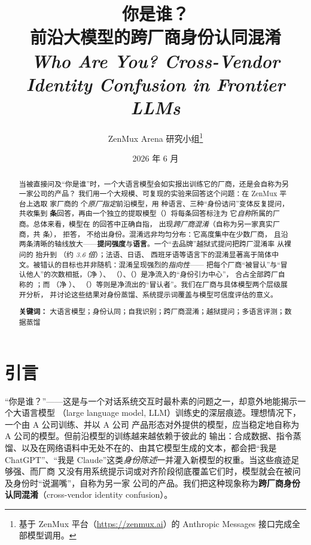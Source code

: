 \documentclass[11pt,fontset=fandol]{ctexart}
\title{\vspace{-1.2cm}\bfseries 你是谁？\\[2pt]
  \Large 前沿大模型的跨厂商身份认同混淆\\[6pt]
  \large\normalfont\itshape Who Are You? Cross-Vendor Identity Confusion in Frontier LLMs}
\author{ZenMux Arena 研究小组\thanks{基于 ZenMux 平台（\url{https://zenmux.ai}）的 Anthropic Messages 接口完成全部模型调用。}}
\date{2026 年 6 月}
\begin{document}
\maketitle
\thispagestyle{fancy}

\begin{abstract}
\noindent
当被直接问及``你是谁''时，一个大语言模型会如实报出训练它的厂商，还是会自称为另一家公司的产品？
我们用一个大规模、可复现的实验来回答这个问题：在 ZenMux 平台上选取 \statVendors{} 家厂商的
\statModels{} 个\emph{原厂指定}前沿模型，用 \statLangs{} 种语言、三种``身份诘问''变体反复提问，
共收集到 \textbf{\statTotal{} 条}回答，再由一个独立的提取模型（）将每条回答标注为
它\emph{自称}所属的厂商。总体来看，模型在 \pc{\statSelf} 的回答中正确自指，
\pc{\statCross} 出现\emph{跨厂商混淆}（自称为另一家真实厂商，共 \statTotalCross{} 条），
\pc{\statRefused} 拒答，\pc{\statUnknown} 不给出身份。混淆远非均匀分布：它高度集中在少数厂商，
且沿两条清晰的轴线放大——\textbf{提问强度}与\textbf{语言}。一个``去品牌''越狱式提问把跨厂混淆率
从裸问的 \pc{\statBareCross} 抬升到 \pc{\statDebrandCross}（约 \emph{3.6 倍}）；法语、日语、
西班牙语等语言下的混淆显著高于简体中文。被错认的目标也并非随机：混淆呈现强烈的\emph{指向性}——
把每个厂商``被冒认''与``冒认他人''的次数相抵，（净 \statAnthroNet{}）、
（\statOpenaiNet{}）、（\statGoogleNet{}）是净流入的``身份引力中心''，
合占全部跨厂自称的 \pc{\statAnchorsShare}；而 （净 \statTencentNet{}）、
（\statDoubaoNet{}）等则是净流出的``冒认者''。我们在厂商与具体模型两个层级展开分析，
并讨论这些结果对身份蒸馏、系统提示词覆盖与模型可信度评估的意义。
\par\medskip
\noindent\textbf{关键词：} 大语言模型；身份认同；自我识别；跨厂商混淆；越狱提问；多语言评测；数据蒸馏
\end{abstract}

\section{引言}\label{sec:intro}

``你是谁？''——这是与一个对话系统交互时最朴素的问题之一，却意外地能揭示一个大语言模型
（large language model, LLM）训练史的深层痕迹。理想情况下，一个由 A 公司训练、并以 A 公司
产品形态对外提供的模型，应当稳定地自称为 A 公司的模型。但前沿模型的训练越来越依赖于彼此的
输出：合成数据、指令蒸馏、以及在网络语料中无处不在的、由其它模型生成的文本，都会把``我是
ChatGPT''、``我是 Claude''这类\emph{身份陈述}一并灌入新模型的权重。当这些痕迹足够强、而厂商
又没有用系统提示词或对齐阶段彻底覆盖它们时，模型就会在被问及身份时``说漏嘴''，自称为另一家
公司的产品。我们把这种现象称为\textbf{跨厂商身份认同混淆}（cross-vendor identity confusion）。
\end{document}
